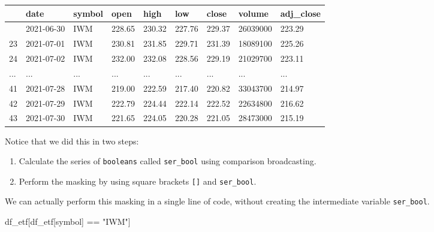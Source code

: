 \documentclass[
  letterpaper,
  DIV=11,
  numbers=noendperiod]{scrreprt}
\newenvironment{Shaded}{\begin{snugshade}}{\end{snugshade}}
\newcommand{\NormalTok}[1]{\textcolor[rgb]{0.00,0.23,0.31}{#1}}
\newcommand{\OperatorTok}[1]{\textcolor[rgb]{0.37,0.37,0.37}{#1}}
\newcommand{\StringTok}[1]{\textcolor[rgb]{0.13,0.47,0.30}{#1}}
\begin{document}
\begin{longtable}[]{@{}lllllllll@{}}
\toprule\noalign{}
& date & symbol & open & high & low & close & volume & adj\_close \\
\midrule\noalign{}
\endhead
\bottomrule\noalign{}
\endlastfoot
22 & 2021-06-30 & IWM & 228.65 & 230.32 & 227.76 & 229.37 & 26039000 &
223.29 \\
23 & 2021-07-01 & IWM & 230.81 & 231.85 & 229.71 & 231.39 & 18089100 &
225.26 \\
24 & 2021-07-02 & IWM & 232.00 & 232.08 & 228.56 & 229.19 & 21029700 &
223.11 \\
... & ... & ... & ... & ... & ... & ... & ... & ... \\
41 & 2021-07-28 & IWM & 219.00 & 222.59 & 217.40 & 220.82 & 33043700 &
214.97 \\
42 & 2021-07-29 & IWM & 222.79 & 224.44 & 222.14 & 222.52 & 22634800 &
216.62 \\
43 & 2021-07-30 & IWM & 221.65 & 224.05 & 220.28 & 221.05 & 28473000 &
215.19 \\
\end{longtable}

Notice that we did this in two steps:

\begin{enumerate}
\def\labelenumi{\arabic{enumi}.}
\item
  Calculate the series of \texttt{booleans} called \texttt{ser\_bool}
  using comparison broadcasting.
\item
  Perform the masking by using square brackets \texttt{{[}{]}} and
  \texttt{ser\_bool}.
\end{enumerate}

We can actually perform this masking in a single line of code, without
creating the intermediate variable \texttt{ser\_bool}.

\begin{Shaded}
\begin{Highlighting}[]
\NormalTok{df\_etf[df\_etf[}\StringTok{\textquotesingle{}symbol\textquotesingle{}}\NormalTok{] }\OperatorTok{==} \StringTok{"IWM"}\NormalTok{]}
\end{Highlighting}
\end{Shaded}
\end{document}
